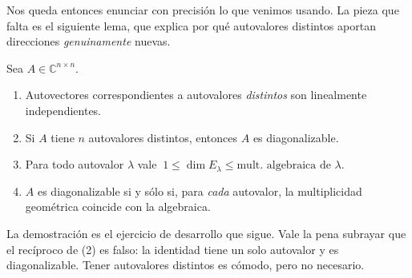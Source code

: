 Nos queda entonces enunciar con precisión lo que venimos usando. La pieza que falta es el
siguiente lema, que explica por qué autovalores distintos aportan direcciones
\emph{genuinamente} nuevas.

\begin{thm}\label{teo:criterio-diag}
Sea $A\in\mathbb{C}^{n\times n}$.
\begin{enumerate}
\item Autovectores correspondientes a autovalores \emph{distintos} son linealmente
independientes.
\item Si $A$ tiene $n$ autovalores distintos, entonces $A$ es diagonalizable.
\item Para todo autovalor $\lambda$ vale
$\ 1\le \dim E_\lambda \le \text{mult.\ algebraica de }\lambda$.
\item $A$ es diagonalizable si y sólo si, para \emph{cada} autovalor, la multiplicidad
geométrica coincide con la algebraica.
\end{enumerate}
\end{thm}

La demostración es el ejercicio de desarrollo que sigue. Vale la pena subrayar que el
recíproco de (2) es falso: la identidad tiene un solo autovalor y es diagonalizable.
Tener autovalores distintos es cómodo, pero no necesario.

